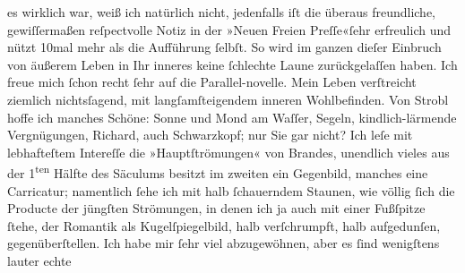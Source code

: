 \begin{ledgroupsized}[t]{13cm}
               es wirklich war, weiß ich natürlich nicht, jedenfalls iſt die überaus freundliche,
               gewiſſermaßen reſpectvolle Notiz in
                  der »Neuen Freien Preſſe«ſehr erfreulich und nützt 10mal mehr als die
               Aufführung ſelbſt. So wird im ganzen dieſer Einbruch von äußerem Leben in Ihr inneres
               keine ſchlechte Laune zurückgelaſſen haben.\pend
           \pstart
           {\pb}Ich freue mich ſchon recht ſehr
               auf die Parallel-novelle.\pend
           \pstart
           Mein Leben verſtreicht ziemlich nichtsſagend, mit \introOben{}langſam\introOben{}{ }ſteigendem inneren Wohlbefinden. Von Strobl hoffe ich manches Schöne: Sonne und Mond am
               Waſſer, Segeln, kindlich-lärmende Vergnügungen, Richard, auch Schwarzkopf; nur Sie
               gar nicht?\pend
           \pstart
           Ich leſe mit lebhafteſtem Intereſſe die »Hauptſtrömungen« von Brandes,
               unendlich vieles aus der 1\textsuperscript{ten} Hälfte des Säculums besitzt
               im zweiten ein Gegenbild, manches eine Carricatur; namentlich ſehe ich mit halb
               ſchauerndem Staunen, {\pb}wie völlig
               ſich die \introOben{}Producte der\introOben{} jüngſten Strömungen, in denen ich ja
               auch mit einer Fußſpitze ſtehe, der Romantik als Kugelſpiegelbild, halb verſchrumpft,
               halb aufgedunſen, gegenüberſtellen.\pend
           \pstart
           Ich habe mir ſehr viel abzugewöhnen, aber es ſind wenigſtens lauter echte

\end{ledgroupsized}
